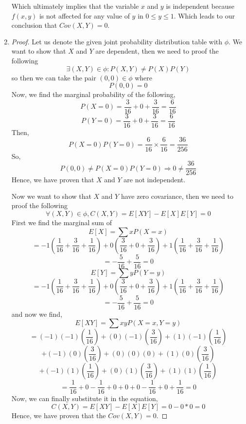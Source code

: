 \documentclass[12pt]{article}
\begin{document}
\begin{enumerate}
		Which ultimately implies that the variable $x$ and $y$ is independent because $f(x,y)$ is not affected for any value of $y$ in $0 \leq y \leq 1$. Which leads to our conclusion that $Cov(X,Y) = 0$.
		\item
		\begin{proof} Let us denote the given joint probability distribution table with $\phi$. We want to show that $X$ and $Y$ are dependent, then we need to proof the following
			$$\exists(X,Y)\in\phi: P(X,Y) \neq P(X)P(Y)$$
			so then we can take the pair $(0,0)\in\phi$ where
			$$P(0,0) = 0$$
			Now, we find the marginal probability of the following,
			$$P(X = 0) = \frac{3}{16} + 0 + \frac{3}{16} = \frac{6}{16}$$
			$$P(Y = 0) = \frac{3}{16} + 0 + \frac{3}{16} = \frac{6}{16}$$
			Then, 
			$$P(X = 0)P(Y = 0) = \frac{6}{16} \times \frac{6}{16} = \frac{36}{256}$$
			So,
			$$P(0,0) \neq P(X = 0)P(Y = 0) \Rightarrow 0 \neq \frac{36}{256}$$
			Hence, we have proven that $X$ and $Y$ are not independent.
			
			Now we want to show that $X$ and $Y$ have zero covariance, then we need to proof the following
			$$\forall(X,Y)\in\phi, C(X,Y) = E[XY] - E[X]E[Y] = 0$$
			First we find the marginal sum of
			$$E[X] = \sum xP(X = x)$$
			$$= -1(\frac{1}{16} + \frac{3}{16} + \frac{1}{16}) + 0(\frac{3}{16} + 0 + \frac{3}{16}) + 1(\frac{1}{16}+ \frac{3}{16} + \frac{1}{16})$$
			$$= -\frac{5}{16} + \frac{5}{16} = 0$$
			$$E[Y] = \sum yP(Y = y)$$
			$$= -1(\frac{1}{16} + \frac{3}{16} + \frac{1}{16}) + 0(\frac{3}{16} + 0 + \frac{3}{16}) + 1(\frac{1}{16}+ \frac{3}{16} + \frac{1}{16})$$
			$$= -\frac{5}{16} + \frac{5}{16} = 0$$
			and now we find,
			$$E[XY] = \sum xyP(X = x, Y = y)$$
			$$= (-1)(-1)(\frac{1}{16}) + (0)(-1)(\frac{3}{16}) + (1)(-1)(\frac{1}{16})$$
			$$ + (-1)(0)(\frac{3}{16}) + (0)(0)(0) + (1)(0)(\frac{3}{16})$$
			$$ + (-1)(1)(\frac{1}{16}) + (0)(1)(\frac{3}{16}) + (1)(1)(\frac{1}{16})$$
			$$= \frac{1}{16} + 0 - \frac{1}{16} + 0 + 0 + 0 - \frac{1}{16} + 0 + \frac{1}{16} = 0$$
			Now, we can finally substitute it in the equation,
			$$C(X,Y) = E[XY] - E[X]E[Y] = 0 - 0*0 = 0$$
			Hence, we have proven that the $Cov(X, Y) = 0$.
			

\end{proof}
\end{enumerate}
\end{document}
